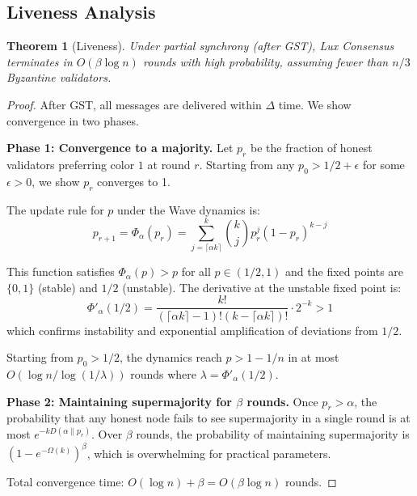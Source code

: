 \documentclass[11pt,a4paper]{article}
\newtheorem{theorem}{Theorem}[section]
\begin{document}
\subsection{Liveness Analysis}

\begin{theorem}[Liveness]
\label{thm:liveness}
Under partial synchrony (after GST), Lux Consensus terminates in $O(\beta \log n)$ rounds
with high probability, assuming fewer than $n/3$ Byzantine validators.
\end{theorem}

\begin{proof}
After GST, all messages are delivered within $\Delta$ time. We show convergence in two phases.

\textbf{Phase 1: Convergence to a majority.}
Let $p_r$ be the fraction of honest validators preferring color $1$ at round $r$. Starting
from any $p_0 > 1/2 + \epsilon$ for some $\epsilon > 0$, we show $p_r$ converges to 1.

The update rule for $p$ under the Wave dynamics is:
\begin{equation}
p_{r+1} = \Phi_\alpha(p_r) = \sum_{j=\lceil \alpha k \rceil}^{k} \binom{k}{j} p_r^j (1-p_r)^{k-j}
\end{equation}

This function satisfies $\Phi_\alpha(p) > p$ for all $p \in (1/2, 1)$ and the fixed points
are $\{0, 1\}$ (stable) and $1/2$ (unstable). The derivative at the unstable fixed point is:
\begin{equation}
\Phi'_\alpha(1/2) = \frac{k!}{(\lceil \alpha k \rceil - 1)!(k - \lceil \alpha k \rceil)!} \cdot 2^{-k} > 1
\end{equation}
which confirms instability and exponential amplification of deviations from $1/2$.

Starting from $p_0 > 1/2$, the dynamics reach $p > 1 - 1/n$ in at most
$O(\log n / \log(1/\lambda))$ rounds where $\lambda = \Phi'_\alpha(1/2)$.

\textbf{Phase 2: Maintaining supermajority for $\beta$ rounds.}
Once $p_r > \alpha$, the probability that any honest node fails to see supermajority
in a single round is at most $e^{-kD(\alpha \| p_r)}$. Over $\beta$ rounds, the
probability of maintaining supermajority is $(1 - e^{-\Omega(k)})^\beta$,
which is overwhelming for practical parameters.

Total convergence time: $O(\log n) + \beta = O(\beta \log n)$ rounds.
\end{proof}
\end{document}
